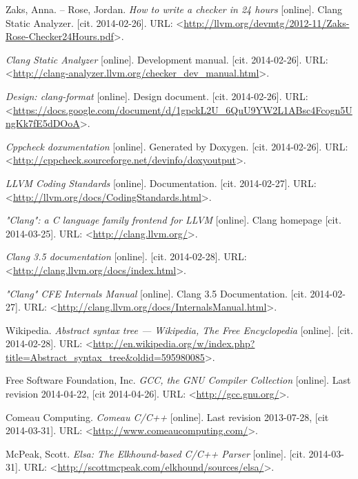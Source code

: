 \begin{thebibliography}{99}
	{\sc Zaks}, Anna. -- {\sc Rose}, Jordan.
	\emph{How to write a checker in 24 hours} [online].
	Clang Static Analyzer.
	[cit. 2014-02-26].
	URL: <\url{http://llvm.org/devmtg/2012-11/Zaks-Rose-Checker24Hours.pdf}>.
	
	\emph{Clang Static Analyzer} [online].
	Development manual.
	[cit. 2014-02-26].
	URL: <\url{http://clang-analyzer.llvm.org/checker_dev_manual.html}>.
	
	\emph{Design: clang-format} [online].
	Design document.
	[cit. 2014-02-26].
	URL: <\url{https://docs.google.com/document/d/1gpckL2U_6QuU9YW2L1ABsc4Fcogn5UngKk7fE5dDOoA}>.
	
	\emph{Cppcheck doxumentation} [online].
	Generated by Doxygen.
	[cit. 2014-02-26].
	URL: <\url{http://cppcheck.sourceforge.net/devinfo/doxyoutput}>.
	
	\emph{LLVM Coding Standards} [online].
	Documentation.
	[cit. 2014-02-27].
	URL: <\url{http://llvm.org/docs/CodingStandards.html}>.
		
	\emph{"Clang": a C language family frontend for LLVM} [online].
	Clang homepage
	[cit. 2014-03-25].
	URL: <\url{http://clang.llvm.org/}>.
	
	\emph{Clang 3.5 documentation} [online].
	[cit. 2014-02-28].
	URL: <\url{http://clang.llvm.org/docs/index.html}>.

	\emph{"Clang" CFE Internals Manual} [online].
	Clang 3.5 Documentation.
	[cit. 2014-02-27].
	URL: <\url{http://clang.llvm.org/docs/InternalsManual.html}>.
	
	{\sc Wikipedia}.
	\emph{Abstract syntax tree --- {W}ikipedia{,} The Free Encyclopedia} [online].
	[cit. 2014-02-28].
	URL: <\url{http://en.wikipedia.org/w/index.php?title=Abstract_syntax_tree&oldid=595980085}>.

	{\sc Free Software Foundation, Inc}.
	\emph{GCC, the GNU Compiler Collection} [online].
	Last revision 2014-04-22, [cit 2014-04-26].
	URL: <\url{http://gcc.gnu.org/}>.

	{\sc Comeau Computing}.
	\emph{Comeau C/C++} [online].
	Last revision 2013-07-28, [cit 2014-03-31].
	URL: <\url{http://www.comeaucomputing.com/}>.

	{\sc McPeak}, Scott.
	\emph{Elsa: The Elkhound-based C/C++ Parser} [online].
	[cit. 2014-03-31].
	URL: <\url{http://scottmcpeak.com/elkhound/sources/elsa/}>.
	

\end{thebibliography}
